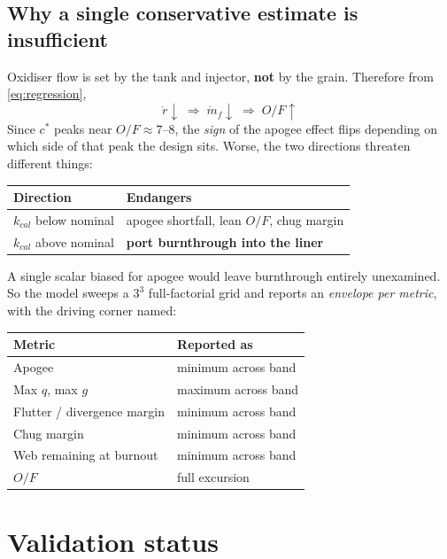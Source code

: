 \documentclass[11pt,a4paper]{article}
\begin{document}
\subsection*{Why a single conservative estimate is insufficient}

Oxidiser flow is set by the tank and injector, \textbf{not} by the grain.
Therefore from \eqref{eq:regression},
\begin{equation}
\dot r \downarrow
\;\Longrightarrow\;
\dot m_f \downarrow
\;\Longrightarrow\;
O\!/\!F \uparrow
\end{equation}
Since $c^*$ peaks near $O\!/\!F \approx 7$--$8$, the \emph{sign} of the apogee
effect flips depending on which side of that peak the design sits. Worse, the
two directions threaten different things:

\begin{center}
\begin{tabular}{@{}ll@{}}
\toprule
Direction & Endangers \\
\midrule
$k_{cal}$ below nominal & apogee shortfall, lean $O\!/\!F$, chug margin \\
$k_{cal}$ above nominal & \textbf{port burnthrough into the liner} \\
\bottomrule
\end{tabular}
\end{center}

\noindent
A single scalar biased for apogee would leave burnthrough entirely unexamined.
So the model sweeps a $3^3$ full-factorial grid and reports an \emph{envelope
per metric}, with the driving corner named:

\begin{center}
\begin{tabular}{@{}ll@{}}
\toprule
Metric & Reported as \\
\midrule
Apogee & minimum across band \\
Max $q$, max $g$ & maximum across band \\
Flutter / divergence margin & minimum across band \\
Chug margin & minimum across band \\
Web remaining at burnout & minimum across band \\
$O\!/\!F$ & full excursion \\
\bottomrule
\end{tabular}
\end{center}

\section{Validation status}
\label{sec:status}
\end{document}
